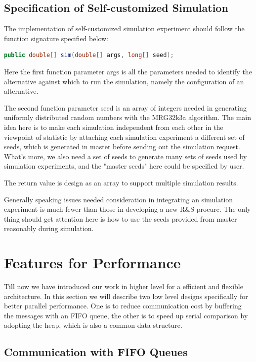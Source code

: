 \documentclass[12pt,a4]{report}
\begin{document}
\subsection{Specification of Self-customized Simulation}

The implementation of self-customized simulation experiment should follow the function signature specified below:

\begin{lstlisting}[language=Java]
public double[] sim(double[] args, long[] seed);
\end{lstlisting}

Here the first function parameter args is all the parameters needed to identify the alternative against which to run the simulation, namely the configuration of an alternative.

The second function parameter seed is an array of integers needed in generating uniformly distributed random numbers with the MRG32k3a algorithm. The main idea here is to make each simulation independent from each other in the viewpoint of statistic by attaching each simulation experiment a different set of seeds, which is generated in master before sending out the simulation request. What's more, we also need a set of seeds to generate many sets of seeds used by simulation experiments, and the "master seeds" here could be specified by user.

The return value is design as an array to support multiple simulation results.

Generally speaking issues needed consideration in integrating an simulation experiment is much fewer than those in developing a new R\&S procure. The only thing should get attention here is how to use the seeds provided from master reasonably during simulation.

\section{Features for Performance}

Till now we have introduced our work in higher level for a efficient and flexible architecture. In this section we will describe two low level designs specifically for better parallel performance. One is to reduce communication cost by buffering the messages with an FIFO queue, the other is to speed up serial comparison by adopting the heap, which is also a common data structure.

\subsection{Communication with FIFO Queues}
\end{document}
